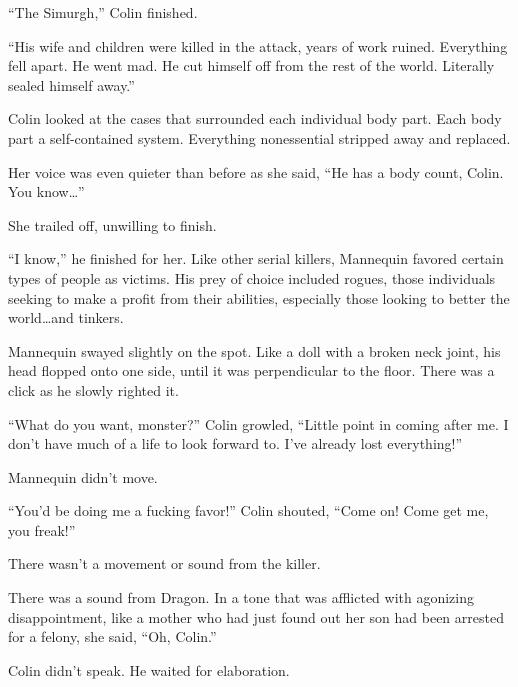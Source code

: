 ``The Simurgh,'' Colin finished.



``His wife and children were killed in the attack, years of work ruined.  Everything fell apart.  He went mad.  He cut himself off from the rest of the world.  Literally sealed himself away.''



Colin looked at the cases that surrounded each individual body part.  Each body part a self-contained system.  Everything nonessential stripped away and replaced.



Her voice was even quieter than before as she said, ``He has a body count, Colin.  You know\ldots''



She trailed off, unwilling to finish.



``I know,'' he finished for her.  Like other serial killers, Mannequin favored certain types of people as victims.  His prey of choice included rogues, those individuals seeking to make a profit from their abilities, especially those looking to better the world\ldots and tinkers.



Mannequin swayed slightly on the spot.  Like a doll with a broken neck joint, his head flopped onto one side, until it was perpendicular to the floor.  There was a click as he slowly righted it.



``What do you want, monster?''  Colin growled, ``Little point in coming after me.  I don't have much of a life to look forward to.  I've already lost everything!''



Mannequin didn't move.



``You'd be doing me a fucking favor!'' Colin shouted, ``Come on!  Come get me, you freak!''



There wasn't a movement or sound from the killer.



There was a sound from Dragon.  In a tone that was afflicted with agonizing disappointment, like a mother who had just found out her son had been arrested for a felony, she said, ``Oh, Colin.''



Colin didn't speak.  He waited for elaboration.



